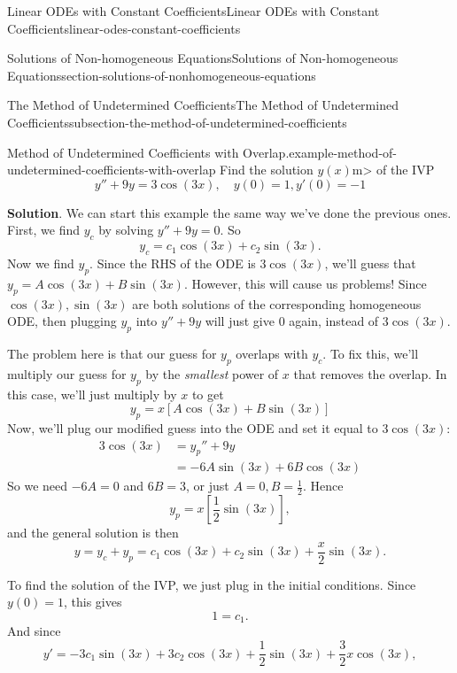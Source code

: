 \documentclass[oneside,10pt,]{book}
\numberwithin{equation}{section}
\newcommand{\amp}{&}
\begin{document}
\begin{chapterptx}{Linear ODEs with Constant Coefficients}{}{Linear ODEs with Constant Coefficients}{}{}{linear-odes-constant-coefficients}
\begin{sectionptx}{Solutions of Non-homogeneous Equations}{}{Solutions of Non-homogeneous Equations}{}{}{section-solutions-of-nonhomogeneous-equations}
\begin{subsectionptx}{The Method of Undetermined Coefficients}{}{The Method of Undetermined Coefficients}{}{}{subsection-the-method-of-undetermined-coefficients}
\begin{example}{Method of Undetermined Coefficients with Overlap.}{example-method-of-undetermined-coefficients-with-overlap}
\hypertarget{p-238}{}%
Find the solution \(y(x)\)m\textgreater{} of the IVP%
\begin{equation*}
y''+9y = 3\cos(3x),\quad y(0) = 1,y'(0) = -1
\end{equation*}
%
\par\smallskip%
\noindent\textbf{Solution}.\hypertarget{solution-34}{}\quad%
\hypertarget{p-239}{}%
We can start this example the same way we've done the previous ones. First, we find \(y_{c}\) by solving \(y''+9y=0\). So%
\begin{equation*}
y_{c} = c_{1}\cos(3x)+c_{2}\sin(3x).
\end{equation*}
Now we find \(y_{p}\). Since the RHS of the ODE is \(3\cos(3x)\), we'll guess that \(y_{p} = A\cos(3x)+B\sin(3x)\). However, this will cause us problems! Since \(\cos(3x),\sin(3x)\) are both solutions of the corresponding homogeneous ODE, then plugging \(y_{p}\) into \(y''+9y\) will just give \(0\) again, instead of \(3\cos(3x)\).%
\par
\hypertarget{p-240}{}%
The problem here is that our guess for \(y_{p}\) overlaps with \(y_{c}\). To fix this, we'll multiply our guess for \(y_{p}\) by the \emph{smallest} power of \(x\) that removes the overlap. In this case, we'll just multiply by \(x\) to get%
\begin{equation*}
y_{p} = x[A\cos(3x)+B\sin(3x)]
\end{equation*}
Now, we'll plug our modified guess into the ODE and set it equal to \(3\cos(3x)\):%
\begin{align*}
3\cos(3x)\amp = y_{p}'' + 9y\\
\amp = -6A\sin(3x)+6B\cos(3x)
\end{align*}
So we need \(-6A = 0\) and \(6B = 3\), or just \(A = 0,B = \frac{1}{2}\). Hence%
\begin{equation*}
y_{p} = x\left[\frac{1}{2}\sin(3x)\right],
\end{equation*}
and the general solution is then%
\begin{equation*}
y = y_{c}+y_{p} = c_{1}\cos(3x)+c_{2}\sin(3x) + \frac{x}{2}\sin(3x).
\end{equation*}
%
\par
\hypertarget{p-241}{}%
To find the solution of the IVP, we just plug in the initial conditions. Since \(y(0) = 1\), this gives%
\begin{equation*}
1 = c_{1}.
\end{equation*}
And since%
\begin{equation*}
y' = -3c_{1}\sin(3x)+3c_{2}\cos(3x) + \frac{1}{2}\sin(3x)+\frac{3}{2}x\cos(3x),

\end{equation*}
\end{example}
\end{subsectionptx}
\end{sectionptx}
\end{chapterptx}
\end{document}
